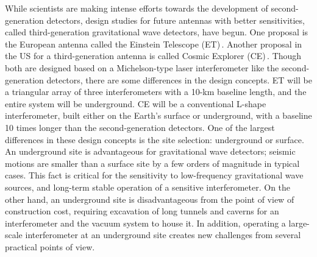 \documentclass[prd ,twocolumn ,secnumarabic,dvips
,amssymb, amsmath,nobibnotes, aps, prd,superscriptaddress]{revtex4-1}
\begin{document}
While scientists are making intense efforts towards the development of second-generation detectors, 
design studies for future antennas with better sensitivities, called  third-generation gravitational wave detectors, have begun. 
One proposal is the European antenna called the Einstein Telescope (ET)\,\cite{ET}. 
Another proposal in the US for a third-generation antenna is called Cosmic Explorer (CE)\,\cite{CE}. 
Though both are designed based on a Michelson-type laser interferometer like the second-generation detectors,
there are some differences in the design concepts.
ET will be a triangular array of three interferometers with a 10-km baseline length, and the entire system 
will be underground. 
CE will be a conventional L-shape interferometer, built either on the Earth's surface or underground, with a baseline 10 times longer than the second-generation detectors.
One of the largest differences in these design concepts is the site selection: underground or surface. 
An underground site is advantageous for gravitational wave detectors; seismic motions are smaller than a surface
site by a few orders of magnitude in typical cases. This fact is critical for the sensitivity to low-frequency gravitational wave sources, 
and long-term stable operation of a sensitive interferometer.
On the other hand, an underground site is disadvantageous from the point of view of construction cost,
requiring excavation of long tunnels and caverns for an interferometer and the vacuum system to house it.
In addition, operating a large-scale interferometer at an underground site creates new challenges 
from several practical points of view.
\end{document}
